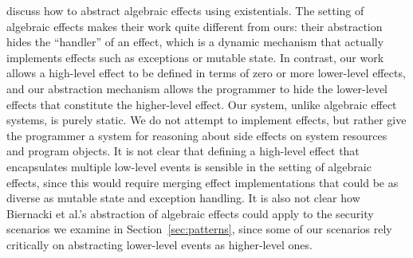 \citet{biernacki19} discuss how to abstract algebraic effects using existentials. The setting of algebraic effects makes their work quite different from ours: their abstraction hides the ``handler'' of an effect, which is a dynamic mechanism that actually implements effects such as exceptions or mutable state. In contrast, our work allows a high-level effect to be defined in terms of zero or more lower-level effects, and our abstraction mechanism allows the programmer to hide the lower-level effects that constitute the higher-level effect. Our system, unlike algebraic effect systems, is purely static. We do not attempt to implement effects, but rather give the programmer a system for reasoning about side effects on system resources and program objects. It is not clear that defining a high-level effect that encapsulates multiple low-level events is sensible in the setting of algebraic effects, since this would require merging effect implementations that could be as diverse as mutable state and exception handling. It is also not clear how Biernacki et al.'s abstraction of algebraic effects could apply to the security scenarios we examine in Section~\ref{sec:patterns}, since some of our scenarios rely critically on abstracting lower-level events as higher-level ones.

